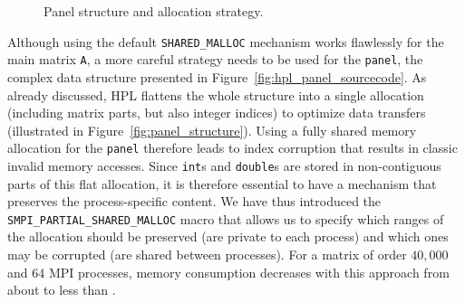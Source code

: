 \begin{figure}[htbp]
{\begin{minipage}{1.0\linewidth}
{\begin{minipage}[b]{\linewidth}
                \end{minipage}%
            }%
            \end{minipage}}
            \caption{Panel structure and allocation strategy.\label{fig:panel}}
        \end{figure}

        Although using the default \texttt{SHARED\_MALLOC} mechanism works flawlessly for the main matrix \texttt{A}, a
        more careful strategy needs to be used for the \texttt{panel}, the complex data structure presented in
        Figure~\ref{fig:hpl_panel_sourcecode}. As already discussed, HPL flattens the whole structure  into a single
        allocation (including matrix parts, but also integer indices) to optimize data transfers (illustrated in
        Figure~\ref{fig:panel_structure}). Using a fully shared memory
        allocation for the \texttt{panel} therefore leads to index corruption that results in classic invalid memory
        accesses. Since \texttt{int}s and \texttt{double}s are stored in non-contiguous parts of this flat allocation,
        it is therefore essential to have a mechanism that preserves the process-specific content. We have thus
        introduced the \texttt{SMPI\_PARTIAL\_SHARED\_MALLOC} macro that allows us to specify which ranges of the
        allocation should be preserved (\ie are private to each process) and which ones may be corrupted (\ie are shared
        between processes).  For a matrix of order \(40,000\) and \(64\) MPI processes, memory consumption decreases
        with this approach from about  to less than .

